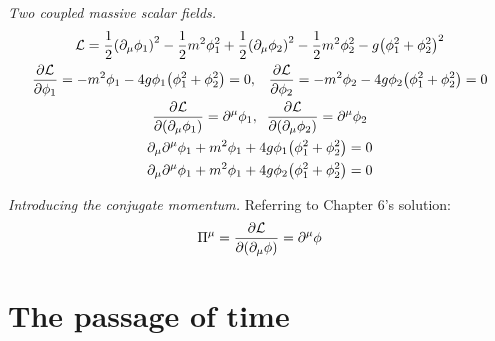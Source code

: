 \documentclass{report}
\begin{document}
\begin{subquests}
	\item \emph{Two coupled massive scalar fields.}
	\begin{gather*}
		\mathcal L = \frac{1}{2}\pqty{\partial_{\mu}\phi_1}^2 - \frac{1}{2}m^2\phi_1^2 + \frac{1}{2}\pqty{\partial_{\mu}\phi_2}^2 - \frac{1}{2}m^2\phi_2^2 - g\pqty{\phi_1^2 + \phi_2^2}^2 \\
		\pdv{\mathcal L}{\phi_1} = -m^2\phi_1 - 4g\phi_1\pqty{\phi_1^2 + \phi_2^2} = 0, \;\;\; \pdv{\mathcal L}{\phi_2} = -m^2\phi_2 - 4g\phi_2\pqty{\phi_1^2 + \phi_2^2} = 0 \\
		\pdv{\mathcal L}{\pqty{\partial_{\mu}\phi_1}} = \partial^{\mu}\phi_1, \;\; \pdv{\mathcal L}{\pqty{\partial_{\mu}\phi_2}} = \partial^{\mu}\phi_2 \\	
		\partial_{\mu}\partial^{\mu}\phi_1 + m^2\phi_1 + 4g\phi_1\pqty{\phi_1^2 + \phi_2^2} = 0 \\
		\partial_{\mu}\partial^{\mu}\phi_1 + m^2\phi_1 + 4g\phi_2\pqty{\phi_1^2 + \phi_2^2} = 0
	\end{gather*}
	\item \emph{Introducing the conjugate momentum.} Referring to Chapter 6's solution:
	\begin{gather*}
		\Pi^{\mu} = \pdv{\mathcal L}{\pqty{\partial_{\mu}\phi}} = \partial^{\mu}\phi
	\end{gather*}
\end{subquests}


\chapter{The passage of time}
\end{document}
